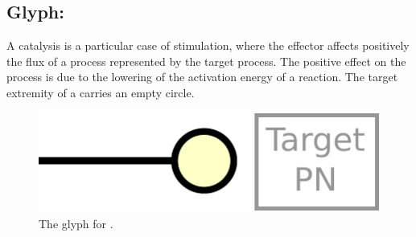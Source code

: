 \subsection{Glyph: }\label{sec:catalysis}

A catalysis is a particular case of stimulation, where the effector affects
positively the flux of a process represented by the target process. The positive effect on the process is due to the lowering of the activation energy of a reaction. The target extremity of a  carries an empty circle.

\begin{figure}[H]
  \centering
  \includegraphics[scale = 0.5]{images/catalysis}
  \caption{The \PD glyph for .}
  \label{fig:catalysis}
\end{figure}



